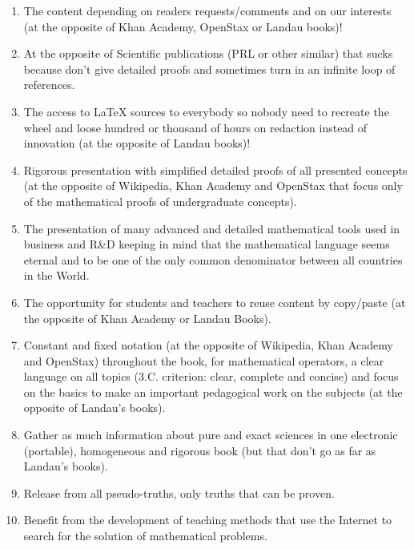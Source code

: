 \begin{enumerate}
		\item The content depending on readers requests/comments and on our interests (at the opposite of Khan Academy, OpenStax or Landau books)!
		
		\item At the opposite of Scientific publications (PRL or other similar) that sucks because don't give detailed proofs and sometimes turn in an infinite loop of references.
		
		\item The access to \LaTeX{} sources to everybody so nobody need to recreate the wheel and loose hundred or thousand of hours on redaction instead of innovation (at the opposite of Landau books)!

		\item Rigorous presentation with simplified detailed proofs of all presented concepts (at the opposite of Wikipedia, Khan Academy and OpenStax that focus only of the mathematical proofs of undergraduate concepts).

		\item The presentation of many advanced and detailed mathematical tools used in business and R\&D keeping in mind that the mathematical language seems eternal and to be one of the only common denominator between all countries in the World.

		\item The opportunity for students and teachers to reuse content by copy/paste (at the opposite of Khan Academy or Landau Books).

		\item Constant and fixed notation (at the opposite of Wikipedia, Khan Academy and OpenStax) throughout the book, for mathematical operators, a clear language on all topics (3.C. criterion: clear, complete and concise) and focus on the basics to make an important pedagogical work on the subjects (at the opposite of Landau's books).

		\item Gather as much information about pure and exact sciences in one electronic (portable), homogeneous and rigorous book (but that don't go as far as Landau's books).

		\item Release from all pseudo-truths, only truths that can be proven.

		\item Benefit from the development of teaching methods that use the Internet to search for the solution of mathematical problems.


\end{enumerate}
